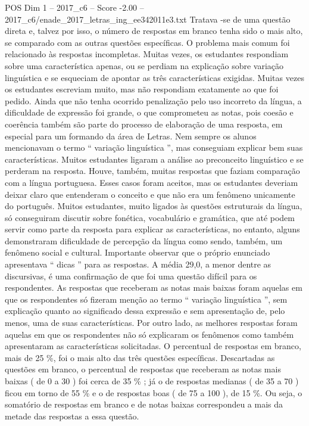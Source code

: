\begin{textsample}{POS Dim 1 – 2017\_c6 – Score -2.00 – 2017\_c6/enade\_2017\_letras\_ing\_ee342011e3.txt}
Tratava -se de uma questão direta e, talvez por isso, o número de respostas em branco tenha sido o mais alto, se comparado com as outras questões específicas.
O problema mais comum foi relacionado às respostas incompletas.
Muitas vezes, os estudantes respondiam sobre uma característica apenas, ou se perdiam na explicação sobre variação linguística e se esqueciam de apontar as três características exigidas.
Muitas vezes os estudantes escreviam muito, mas não respondiam exatamente ao que foi pedido.
Ainda que não tenha ocorrido penalização pelo uso incorreto da língua, a dificuldade de expressão foi grande, o que comprometeu as notas, pois coesão e coerência também são parte do processo de elaboração de uma resposta, em especial para um formando da área de Letras.
Nem sempre os alunos mencionavam o termo “ variação linguística ”, mas conseguiam explicar bem suas características.
Muitos estudantes ligaram a análise ao preconceito linguístico e se perderam na resposta.
Houve, também, muitas respostas que faziam comparação com a língua portuguesa.
Esses casos foram aceitos, mas os estudantes deveriam deixar claro que entenderam o conceito e que não era um fenômeno unicamente do português.
Muitos estudantes, muito ligados às questões estruturais da língua, só conseguiram discutir sobre fonética, vocabulário e gramática, que até podem servir como parte da resposta para explicar as características, no entanto, alguns demonstraram dificuldade de percepção da língua como sendo, também, um fenômeno social e cultural.
Importante observar que o próprio enunciado apresentava “ dicas ” para as respostas.
A média 29,0, a menor dentre as discursivas, é uma confirmação de que foi uma questão difícil para os respondentes.
As respostas que receberam as notas mais baixas foram aquelas em que os respondentes só fizeram menção ao termo “ variação linguística ”, sem explicação quanto ao significado dessa expressão e sem apresentação de, pelo menos, uma de suas características.
Por outro lado, as melhores respostas foram aquelas em que os respondentes não só explicaram os fenômenos como também apresentaram as características solicitadas.
O percentual de respostas em branco, mais de 25 \%, foi o mais alto das três questões específicas.
Descartadas as questões em branco, o percentual de respostas que receberam as notas mais baixas ( de 0 a 30 ) foi cerca de 35 \% ; já o de respostas medianas ( de 35 a 70 ) ficou em torno de 55 \% e o de respostas boas ( de 75 a 100 ), de 15 \%.
Ou seja, o somatório de respostas em branco e de notas baixas correspondeu a mais da metade das respostas a essa questão.

\end{textsample}
